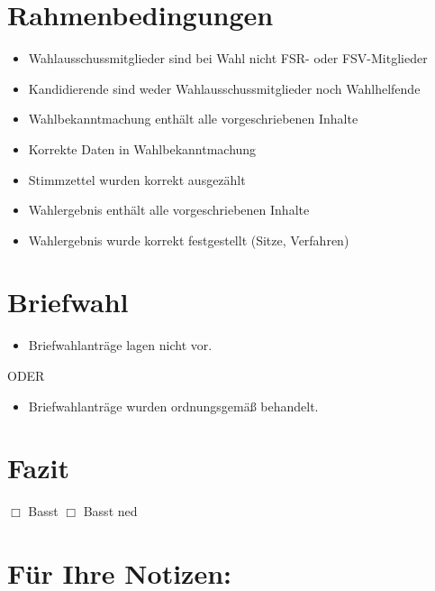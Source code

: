 \documentclass[a4paper]{scrartcl}
\begin{document}
\section{Rahmenbedingungen}
\begin{itemize}[label=$\Box$]
\item Wahlausschussmitglieder sind bei Wahl nicht FSR- oder FSV-Mitglieder
\item Kandidierende sind weder Wahlausschussmitglieder noch Wahlhelfende
\item Wahlbekanntmachung enthält alle vorgeschriebenen Inhalte
\item Korrekte Daten in Wahlbekanntmachung
\item Stimmzettel wurden korrekt ausgezählt
\item Wahlergebnis enthält alle vorgeschriebenen Inhalte
\item Wahlergebnis wurde korrekt festgestellt (Sitze, Verfahren)
\end{itemize}

\section{Briefwahl}
\begin{itemize}[label=$\Box$]
\item Briefwahlanträge lagen nicht vor.
\end{itemize}

 ODER
 
\begin{itemize}[label=$\Box$]
\item Briefwahlanträge wurden ordnungsgemäß behandelt.
\end{itemize}

\section{Fazit}
$\Box$ Basst \hspace{1cm} $\Box$ Basst ned

\section*{Für Ihre Notizen:}

\hrulefill
\vspace{0.5cm}

\hrulefill
\vspace{0.5cm}

\hrulefill
\end{document}

